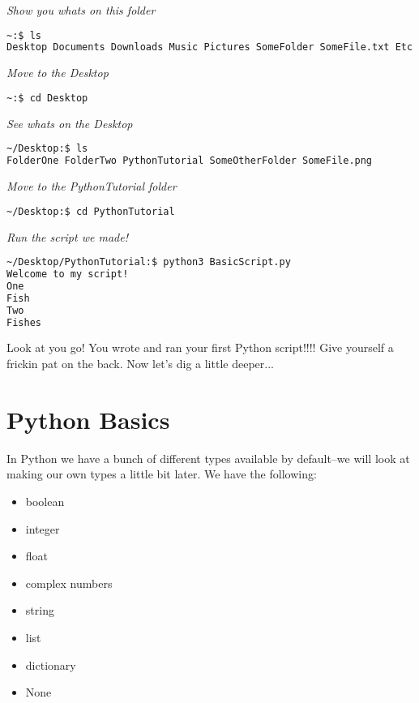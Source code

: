 \documentclass[11pt, twoside, reqno]{book}
\begin{document}
\textit{Show you whats on this folder}
\begin{lstlisting}[language=sh]
~:$ ls      
Desktop Documents Downloads Music Pictures SomeFolder SomeFile.txt Etc.md
\end{lstlisting}

\textit{Move to the Desktop}
\begin{lstlisting}[language=sh]
~:$ cd Desktop      
\end{lstlisting}

\textit{See whats on the Desktop}
\begin{lstlisting}[language=sh]
~/Desktop:$ ls      
FolderOne FolderTwo PythonTutorial SomeOtherFolder SomeFile.png
\end{lstlisting}

\textit{Move to the PythonTutorial folder}
\begin{lstlisting}[language=sh]
~/Desktop:$ cd PythonTutorial      
\end{lstlisting}

\textit{Run the script we made!}
\begin{lstlisting}[language=sh]
~/Desktop/PythonTutorial:$ python3 BasicScript.py
Welcome to my script!
One
Fish
Two
Fishes
\end{lstlisting}

Look at you go! You wrote and ran your first Python script!!!! Give yourself a frickin pat on the back. Now let's dig a little deeper...

\section{Python Basics}

In Python we have a bunch of different types available by default--we will look at making our own types a little bit later. We have the following:
\begin{itemize} \item boolean\end{itemize}
\begin{itemize} \item integer\end{itemize}
\begin{itemize} \item float\end{itemize}
\begin{itemize} \item complex numbers\end{itemize}
\begin{itemize} \item string\end{itemize}
\begin{itemize} \item list\end{itemize}
\begin{itemize} \item dictionary\end{itemize}
\begin{itemize} \item None\end{itemize}
\end{document}
